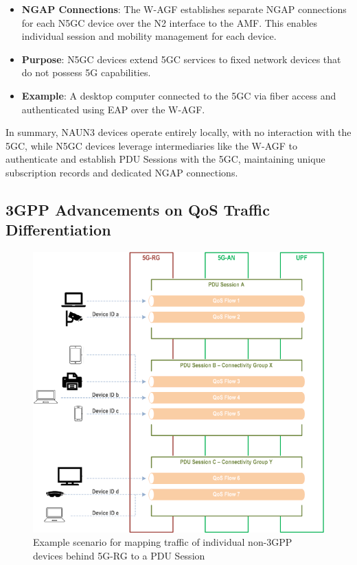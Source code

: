 \begin{itemize}
{\begin{itemize}
{            }
            \item {
                \textbf{\ac{NGAP} Connections}: The \ac{W-AGF} establishes separate \ac{NGAP} connections for each \ac{N5GC} device over the N2 interface to the \ac{AMF}. This enables individual session and mobility management for each device.
            }
            \item {
                \textbf{Purpose}: \ac{N5GC} devices extend \ac{5GC} services to fixed network devices that do not possess \ac{5G} capabilities.
            }
            \item {
                \textbf{Example}: A desktop computer connected to the \ac{5GC} via fiber access and authenticated using \ac{EAP} over the \ac{W-AGF}.
            }
        \end{itemize}    
    }
\end{itemize}

In summary, \ac{NAUN3} devices operate entirely locally, with no interaction with the \ac{5GC}, while \ac{N5GC} devices leverage intermediaries like the \ac{W-AGF} to authenticate and establish \ac{PDU} Sessions with the \ac{5GC}, maintaining unique subscription records and dedicated \ac{NGAP} connections.

\subsection{\acs{3GPP} Advancements on \acs{QoS} Traffic Differentiation}

\begin{figure}
    \centering
    \includegraphics[width=0.75\linewidth]{figs/Example scenario for mapping traffic of individual non-3GPP devices behind 5G-RG to a PDU Session.png}
    \caption{Example scenario for mapping traffic of individual non-\acs{3GPP} devices behind \acs{5G-RG} to a \acs{PDU} Session}
    \label{fig:Example scenario for mapping traffic of individual non-3GPP devices behind 5G-RG to a PDU Session}
\end{figure}


